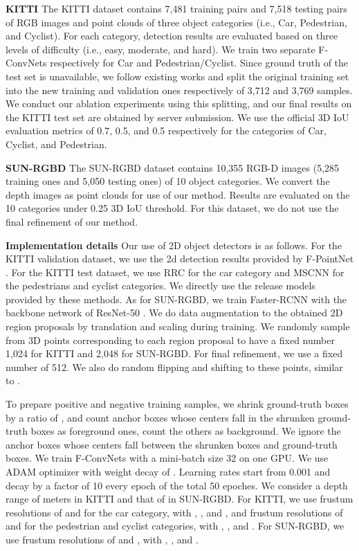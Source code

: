 \documentclass[letterpaper, 10 pt, conference]{ieeeconf}
\begin{document}
\noindent\textbf{KITTI} The KITTI dataset \cite{geiger2012we} contains 7,481 training pairs and 7,518 testing pairs of RGB images and point clouds of three object categories (i.e., Car, Pedestrian, and Cyclist). For each category, detection results are evaluated based on three levels of difficulty (i.e., easy, moderate, and hard). We train two separate F-ConvNets respectively for Car and Pedestrian/Cyclist. Since ground truth of the test set is unavailable, we follow existing works \cite{chen2017multi} and split the original training set into the new training and validation ones respectively of 3,712 and 3,769 samples. We conduct our ablation experiments using this splitting, and our final results on the KITTI test set are obtained by server submission. We use the official 3D IoU evaluation metrics of 0.7, 0.5, and 0.5 respectively for the categories of Car, Cyclist, and Pedestrian.

\vspace{0.1cm}
\noindent\textbf{SUN-RGBD} The SUN-RGBD dataset \cite{song2015sun} contains 10,355 RGB-D images (5,285 training ones and 5,050 testing ones) of 10 object categories. We convert the depth images as point clouds for use of our method. Results are evaluated on the 10 categories under 0.25 3D IoU threshold. For this dataset, we do not use the final refinement of our method.

\vspace{0.1cm}
\noindent\textbf{Implementation details} Our use of 2D object detectors is as follows. For the KITTI validation dataset, we use the 2d detection results provided by F-PointNet \cite{qi2018frustum}. For the KITTI test dataset, we use RRC \cite{ren2017accurate} for the car category and MSCNN \cite{cai2016unified} for the pedestrians and cyclist categories. We directly use the release models provided by these methods. As for SUN-RGBD, we train Faster-RCNN \cite{ren2015faster} with the backbone network of ResNet-50 \cite{he2016deep}. We do data augmentation to the obtained 2D region proposals by translation and scaling during training. We randomly sample from 3D points corresponding to each region proposal to have a fixed number 1,024 for KITTI and 2,048 for SUN-RGBD. For final refinement, we use a fixed number of 512. We also do random flipping and shifting to these points, similar to \cite{qi2018frustum}.

To prepare positive and negative training samples, we shrink ground-truth boxes by a ratio of , and count anchor boxes whose centers fall in the shrunken ground-truth boxes as foreground ones, count the others as background. We ignore the anchor boxes whose centers fall between the shrunken boxes and ground-truth boxes.  We train F-ConvNets with a mini-batch size 32 on one GPU. We use ADAM optimizer with weight decay of  . Learning rates start from 0.001 and decay by a factor of 10 every  epoch of the total 50 epoches. We consider a depth range of  meters in KITTI and that of  in SUN-RGBD. For KITTI, we use  frustum resolutions of  and  for the car category, with , , and , and  frustum resolutions of  and  for the pedestrian and cyclist categories, with , , and . For SUN-RGBD, we use  frustum resolutions of  and , with , , and .
\end{document}
